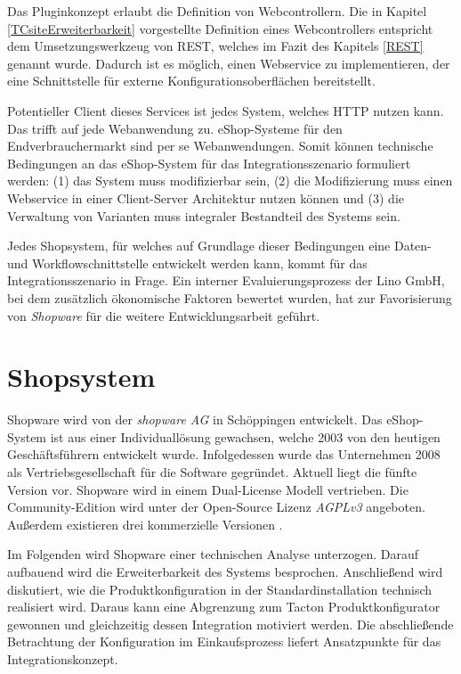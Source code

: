 \documentclass[11pt, a4paper, titlepage, listof=totoc, bibliography=totoc, index=totoc, twoside, openright, headings=normal]{scrreprt}
\begin{document}
Das Pluginkonzept erlaubt die Definition von Webcontrollern. Die in Kapitel \ref{TCsiteErweiterbarkeit} vorgestellte Definition eines Webcontrollers entspricht dem  Umsetzungswerkzeug von REST, welches im Fazit des Kapitels \ref{REST} genannt wurde. Dadurch ist es möglich, einen Webservice zu implementieren, der eine Schnittstelle für externe Konfigurationsoberflächen bereitstellt.

Potentieller Client dieses Services ist jedes System, welches HTTP nutzen kann. Das trifft auf jede Webanwendung zu. eShop-Systeme für den Endverbrauchermarkt sind per se Webanwendungen. Somit können technische Bedingungen an das eShop-System für das Integrationsszenario formuliert werden: (1) das System muss modifizierbar sein, (2) die Modifizierung muss einen Webservice in einer Client-Server Architektur nutzen können und (3) die Verwaltung von Varianten muss integraler Bestandteil des Systems sein.

Jedes Shopsystem, für welches auf Grundlage dieser Bedingungen eine Daten- und Workflowschnittstelle entwickelt werden kann, kommt für das Integrationsszenario in Frage. Ein interner Evaluierungsprozess der Lino GmbH, bei dem zusätzlich ökonomische Faktoren bewertet wurden, hat zur Favorisierung von \emph{Shopware} für die weitere Entwicklungsarbeit geführt.

\section{Shopsystem}
\label{Shopsystem}

Shopware wird von der \emph{shopware AG} in Schöppingen entwickelt. Das eShop-System ist aus einer Individuallösung gewachsen, welche 2003 von den heutigen Geschäftsführern entwickelt wurde. Infolgedessen wurde das Unternehmen 2008 als Vertriebsgesellschaft für die Software gegründet. Aktuell liegt die fünfte Version vor. Shopware wird in einem Dual-License Modell vertrieben. Die Community-Edition wird unter der \citeauthor{gnuAGPLv3} Open-Source Lizenz \emph{AGPLv3} angeboten. Außerdem existieren drei kommerzielle Versionen \citep{shopwareUnternehmen}.

Im Folgenden wird Shopware einer technischen Analyse unterzogen. Darauf aufbauend wird die Erweiterbarkeit des Systems besprochen. Anschließend wird diskutiert, wie die Produktkonfiguration in der Standardinstallation technisch realisiert wird. Daraus kann eine Abgrenzung zum Tacton Produktkonfigurator gewonnen und gleichzeitig dessen Integration motiviert werden. Die abschließende Betrachtung der Konfiguration im Einkaufsprozess liefert Ansatzpunkte für das Integrationskonzept.
\end{document}
